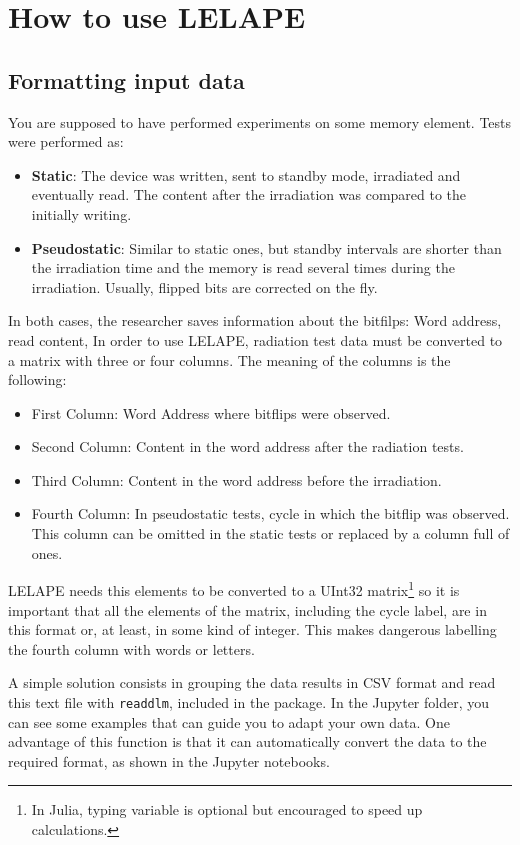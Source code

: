 \chapter{How to use LELAPE}
\section{Formatting input data}
%
You are supposed to have performed experiments on some memory element. Tests were performed as:
\begin{itemize}
	\item \textbf{Static}: The device was written, sent to standby mode, irradiated and eventually read. The content after the irradiation was compared to the initially writing.
	\item \textbf{Pseudostatic}: Similar to static ones, but standby intervals are shorter than the irradiation time and the memory is read several times during the irradiation. Usually, flipped bits are corrected on the fly.
\end{itemize}

In both cases, the researcher saves information about the bitfilps: Word address, read content, 
In order to use LELAPE, radiation test data must be converted to a matrix with three or four columns. The meaning of the columns is the following:
\begin{itemize}
	\item First Column: Word Address where bitflips were observed.
	\item Second Column: Content in the word address after the radiation tests.
	\item Third Column: Content in the word address before the irradiation.
	\item Fourth Column: In pseudostatic tests, cycle in which the bitflip was observed. This column can be omitted in the static tests or replaced by a column full of ones. 
\end{itemize} 

LELAPE needs this elements to be converted to a UInt32 matrix\footnote{In Julia, typing variable is optional but encouraged to speed up calculations.} so it is important that all the elements of the matrix, including the cycle label, are in this format or, at least, in some kind of integer. This makes dangerous labelling the fourth column with words or letters. 

A simple solution consists in grouping the data results in CSV format and read this text file with \texttt{readdlm}, included in the  package. In the Jupyter folder, you can see some examples that can guide you to adapt your own data. One advantage of this function is that it can automatically convert the data to the required format, as shown in the Jupyter notebooks.

